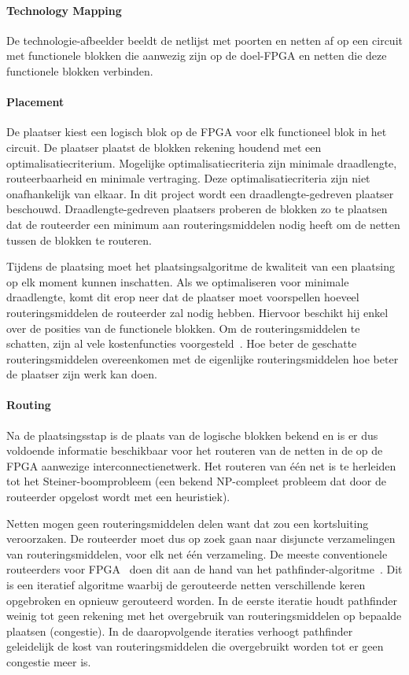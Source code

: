 \documentclass[a4paper,oneside,12pt]{article}
\begin{document}
\paragraph{Technology Mapping} 
De technologie-afbeelder beeldt de netlijst met poorten en netten af op een circuit met functionele blokken die aanwezig zijn op de doel-FPGA en netten die deze functionele blokken verbinden.

\paragraph{Placement}
De plaatser kiest een logisch blok op de FPGA voor elk functioneel blok in het circuit. De plaatser plaatst de blokken rekening houdend met een optimalisatiecriterium. Mogelijke optimalisatiecriteria zijn minimale draadlengte, routeerbaarheid en minimale vertraging. Deze optimalisatiecriteria zijn niet onafhankelijk van elkaar. In dit project wordt een draadlengte-gedreven plaatser beschouwd. Draadlengte-gedreven plaatsers proberen de blokken zo te plaatsen dat de routeerder een minimum aan routeringsmiddelen nodig heeft om de netten tussen de blokken te routeren.

Tijdens de plaatsing moet het plaatsingsalgoritme de kwaliteit van een plaatsing op elk moment kunnen inschatten. Als we optimaliseren voor minimale draadlengte, komt dit erop neer dat de plaatser moet voorspellen hoeveel routeringsmiddelen de routeerder zal nodig hebben. Hiervoor beschikt hij enkel over de posities van de functionele blokken. Om de routeringsmiddelen te schatten, zijn al vele kostenfuncties voorgesteld~\cite{vprBVRJ, vprboek}. Hoe beter de geschatte routeringsmiddelen overeenkomen met de eigenlijke routeringsmiddelen hoe beter de plaatser zijn werk kan doen.

\paragraph{Routing} Na de plaatsingsstap is de plaats van de logische blokken bekend en is er dus voldoende informatie beschikbaar voor het routeren van de netten in de op de FPGA aanwezige interconnectienetwerk. Het routeren van \'e\'en net is te herleiden tot het Steiner-boomprobleem (een bekend NP-compleet probleem dat door de routeerder opgelost wordt met een heuristiek).

Netten mogen geen routeringsmiddelen delen want dat zou een kortsluiting veroorzaken. De routeerder moet dus op zoek gaan naar disjuncte verzamelingen van routeringsmiddelen, voor elk net \'e\'en verzameling. De meeste conventionele routeerders voor FPGA~\cite{vprBVRJ, vprboek} doen dit aan de hand van het pathfinder-algoritme~\cite{pathfinder}. Dit is een iteratief algoritme waarbij de gerouteerde netten verschillende keren opgebroken en opnieuw gerouteerd worden. In de eerste iteratie houdt pathfinder weinig tot geen rekening met het overgebruik van routeringsmiddelen op bepaalde plaatsen (congestie). In de daaropvolgende iteraties verhoogt pathfinder geleidelijk de kost van routeringsmiddelen die overgebruikt worden tot er geen congestie meer is.
\end{document}

